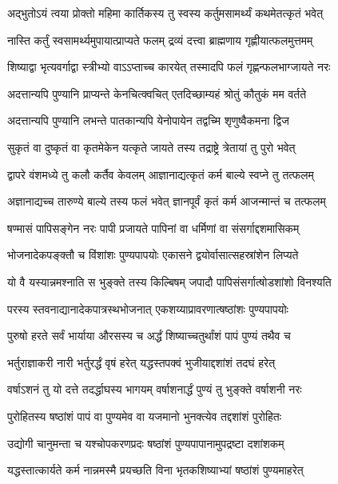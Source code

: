 \twolineshloka
{अद्भुतोऽयं त्वया प्रोक्तो महिमा कार्तिकस्य तु}
{स्वस्य कर्तुमसामर्थ्यं कथमेतत्कृतं भवेत्} %


\twolineshloka
{नास्ति कर्तुं स्वसामर्थ्यमुपायात्प्राप्यते फलम्}
{द्रव्यं दत्त्वा ब्राह्मणाय गृह्णीयात्फलमुत्तमम्} %

\twolineshloka
{शिष्याद्वा भृत्यवर्गाद्वा स्त्रीभ्यो वाऽऽप्ताच्च कारयेत्}
{तस्मादपि फलं गृह्णन्फलभाग्जायते नरः} %


\twolineshloka
{अदत्तान्यपि पुण्यानि प्राप्यन्ते केनचित्क्वचित्}
{एतदिच्छाम्यहं श्रोतुं कौतुकं मम वर्तते} %


\twolineshloka
{अदत्तान्यपि पुण्यानि लभन्ते पातकान्यपि}
{येनोपायेन तद्वच्मि शृणुष्वैकमना द्विज} %

\twolineshloka
{सुकृतं वा दुष्कृतं वा कृतमेकेन यत्कृते}
{जायते तस्य तद्राष्ट्रे त्रेतायां तु पुरो भवेत्} %

\twolineshloka
{द्वापरे वंशमध्ये तु कलौ कर्तैव केवलम्}
{आज्ञानाद्यत्कृतं कर्म बाल्ये स्वप्ने तु तत्फलम्} %

\twolineshloka
{अज्ञानाद्यच्च तारुण्ये बाल्ये तस्य फलं भवेत्}
{ज्ञानपूर्वं कृतं कर्म आजन्मान्तं च तत्फलम्} %

\twolineshloka
{षण्मासं पापिसङ्गेन नरः पापी प्रजायते}
{पापिनां वा धर्मिणां वा संसर्गाद्दशमासिकम्} %

\twolineshloka
{भोजनादेकपङ्क्तौ च विंशांशः पुण्यपापयोः}
{एकासने द्वयोर्वासात्सहस्रांशेन लिप्यते} %

\twolineshloka
{यो वै यस्यान्नमश्नाति स भुङ्क्ते तस्य किल्बिषम्}
{जपादौ पापिसंसर्गात्षोडशांशो विनश्यति} %

\twolineshloka
{परस्य स्तवनाद्यानादेकपात्रस्थभोजनात्}
{एकशय्याप्रावरणात्षष्ठांशः पुण्यपापयोः} %

\twolineshloka
{पुरुषो हरते सर्वं भार्याया औरसस्य च}
{अर्द्धं शिष्याच्चतुर्थांशं पापं पुण्यं तथैव च} %

\twolineshloka
{भर्तुराज्ञाकरी नारी भर्तुरर्द्धं वृषं हरेत्}
{यद्धस्तपक्वं भुजीयाद्दशांशं तदघं हरेत्} %

\twolineshloka
{वर्षाऽशनं तु यो दत्ते तदर्द्धाघस्य भागयम्}
{वर्षाशनार्द्धं पुण्यं तु भुङ्क्ते वर्षाशनी नरः} %

\twolineshloka
{पुरोहितस्य षष्ठांशं पापं वा पुण्यमेव वा}
{यजमानो भुनक्त्येव तद्दशांशं पुरोहितः} %

\twolineshloka
{उद्योगी चानुमन्ता च यश्चोपकरणप्रदः}
{षष्ठांशं पुण्यपापानामुपद्रष्टा दशांशकम्} %

\twolineshloka
{यद्धस्तात्कार्यते कर्म नान्नमस्मै प्रयच्छति}
{विना भृतकशिष्याभ्यां षष्ठांशं पुण्यमाहरेत्} %

